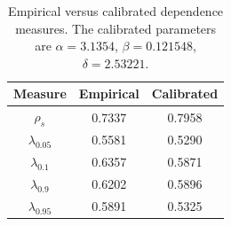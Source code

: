 \begin{table}[t]
  \centering
  \begin{tabular}{|c||c|c|}
    \hline %
    Measure & Empirical & Calibrated\\\hline
    $\rho_s$ & 0.7337 & 0.7958\\
    $\lambda_{0.05}$ & 0.5581 & 0.5290\\
    $\lambda_{0.1}$ & 0.6357 & 0.5871\\
    $\lambda_{0.9}$ & 0.6202 & 0.5896\\
    $\lambda_{0.95}$ & 0.5891 & 0.5325\\\hline
  \end{tabular}
  \caption{Empirical versus calibrated dependence measures. The
    calibrated parameters are $\alpha=3.1354$, $\beta=0.121548$,
    $\delta=2.53221$. }
  \label{tab:nigcopula}
\end{table}


